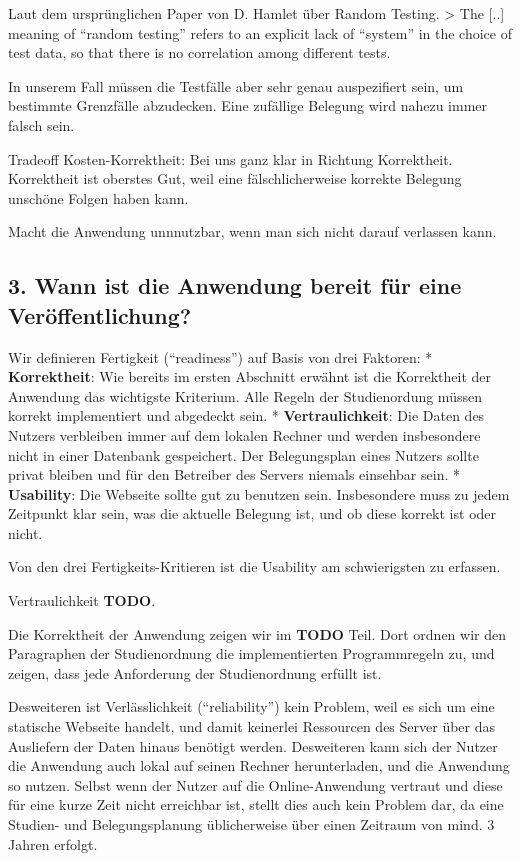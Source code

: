 \documentclass[ngerman]{article}
\begin{document}
Laut dem ursprünglichen Paper von D. Hamlet über Random Testing.
\textgreater{} The {[}..{]} meaning of ``random testing'' refers to an
explicit lack of ``system'' in the choice of test data, so that there is
no correlation among different tests.

In unserem Fall müssen die Testfälle aber sehr genau auspezifiert sein,
um bestimmte Grenzfälle abzudecken. Eine zufällige Belegung wird nahezu
immer falsch sein.

Tradeoff Kosten-Korrektheit: Bei uns ganz klar in Richtung Korrektheit.
Korrektheit ist oberstes Gut, weil eine fälschlicherweise korrekte
Belegung unschöne Folgen haben kann.

Macht die Anwendung unnnutzbar, wenn man sich nicht darauf verlassen
kann.

\subsection{3. Wann ist die Anwendung bereit für eine Veröffentlichung?}

Wir definieren Fertigkeit (``readiness'') auf Basis von drei Faktoren: *
\textbf{Korrektheit}: Wie bereits im ersten Abschnitt erwähnt ist die
Korrektheit der Anwendung das wichtigste Kriterium. Alle Regeln der
Studienordung müssen korrekt implementiert und abgedeckt sein. *
\textbf{Vertraulichkeit}: Die Daten des Nutzers verbleiben immer auf dem
lokalen Rechner und werden insbesondere nicht in einer Datenbank
gespeichert. Der Belegungsplan eines Nutzers sollte privat bleiben und
für den Betreiber des Servers niemals einsehbar sein. *
\textbf{Usability}: Die Webseite sollte gut zu benutzen sein.
Insbesondere muss zu jedem Zeitpunkt klar sein, was die aktuelle
Belegung ist, und ob diese korrekt ist oder nicht.

Von den drei Fertigkeits-Kritieren ist die Usability am schwierigsten zu
erfassen.

Vertraulichkeit \textbf{TODO}.

Die Korrektheit der Anwendung zeigen wir im \textbf{TODO} Teil. Dort
ordnen wir den Paragraphen der Studienordnung die implementierten
Programmregeln zu, und zeigen, dass jede Anforderung der Studienordnung
erfüllt ist.

Desweiteren ist Verlässlichkeit (``reliability'') kein Problem, weil es
sich um eine statische Webseite handelt, und damit keinerlei Ressourcen
des Server über das Ausliefern der Daten hinaus benötigt werden.
Desweiteren kann sich der Nutzer die Anwendung auch lokal auf seinen
Rechner herunterladen, und die Anwendung so nutzen. Selbst wenn der
Nutzer auf die Online-Anwendung vertraut und diese für eine kurze Zeit
nicht erreichbar ist, stellt dies auch kein Problem dar, da eine
Studien- und Belegungsplanung üblicherweise über einen Zeitraum von
mind. 3 Jahren erfolgt.
\end{document}
